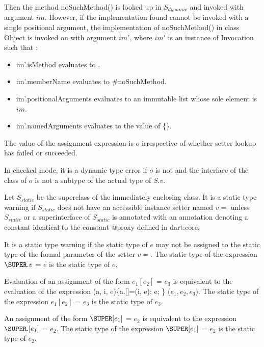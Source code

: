 \documentclass{article}
\newcommand{\code}[1]{{\sf #1}}
\begin{document}
\LMHash{}
Then the method \code{noSuchMethod()} is looked up in $S_{dynamic}$ and invoked  with argument $im$.
However, if the implementation found cannot be invoked with a single positional argument, the implementation  of \code{noSuchMethod()} in class \code{Object} is invoked on \THIS{} with argument $im'$, where $im'$ is an instance of \code{Invocation} such that :
\begin{itemize}
\item  \code{im'.isMethod} evaluates to \code{\TRUE{}}.
\item  \code{im'.memberName} evaluates to \code{\#noSuchMethod}.
\item \code{im'.positionalArguments} evaluates to an immutable list whose sole element is  $im$.
\item \code{im'.namedArguments} evaluates to the value of \code{\CONST{} \{\}}.
\end{itemize}

\LMHash{}
The value of the assignment expression is $o$ irrespective of whether setter lookup has failed or succeeded.

\LMHash{}
In checked mode, it is a dynamic type error if $o$ is not \NULL{} and the interface of the class of $o$ is not a subtype of the actual type of $S.v$.

\LMHash{}
Let $S_{static}$ be the superclass of the immediately enclosing class. It is a static type warning if $S_{static}$ does not have an accessible instance setter named $v=$ unless $S_{static}$ or a superinterface of $S_{static}$ is annotated with an annotation denoting a constant identical to the constant \code{@proxy} defined in \code{dart:core}.

\LMHash{}
It is a static type warning if the static type of $e$ may not be assigned to the static type of the formal parameter of the setter $v=$.   The static type of the expression $\SUPER.v$ \code{=} $e$ is the static type of $e$.






\LMHash{}
Evaluation of an assignment of the form $e_1[e_2]$ \code{=} $e_3$ is equivalent to the evaluation of the expression \code{(a, i, e)\{a.[]=(i, e); \RETURN{} e; \} ($e_1, e_2, e_3$)}.  The static type of the expression $e_1[e_2]$ \code{=} $e_3$ is the static type of $e_3$.

\LMHash{}
An assignment of the form $\SUPER[e_1]$ \code{=} $e_2$ is equivalent to the expression $\SUPER.[e_1]$ \code{=} $e_2$.  The static type of the expression $\SUPER[e_1]$ \code{=} $e_2$ is the static type of $e_2$.
\end{document}

